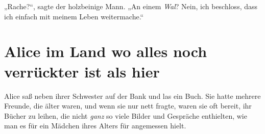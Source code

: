 „Rache?“, sagte der holzbeinige Mann. „An einem \emph{Wal}? Nein, ich beschloss, dass ich einfach mit meinem Leben weitermache.“

\section{Alice im Land wo alles noch verrückter ist als hier\protect\footnotemark}
Alice saß neben ihrer Schwester auf der Bank und las ein Buch. Sie hatte mehrere Freunde, die älter waren, und wenn sie nur nett fragte, waren sie oft bereit, ihr Bücher zu leihen, die nicht \emph{ganz} so viele Bilder und Gespräche enthielten, wie man es für ein Mädchen ihres Alters für angemessen hielt.

